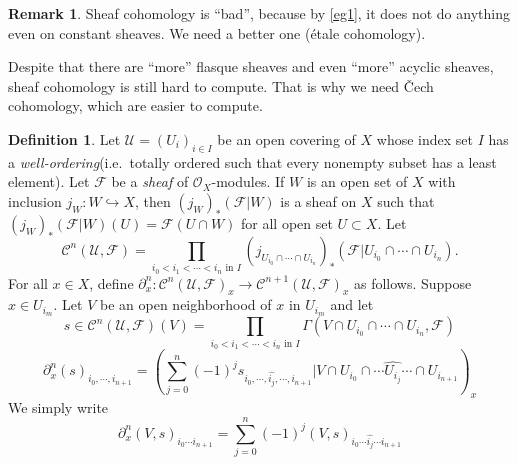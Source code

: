 \documentclass{amsart}
\numberwithin{equation}{section}
\theoremstyle{plain}
\theoremstyle{definition}
\newtheorem{defn}[equation]{Definition}
\newtheorem{rem}[equation]{Remark}
\begin{document}
\begin{rem}	
	Sheaf cohomology is ``bad'', because by \cref{eg1}, it does not do anything even on constant sheaves. 
	We need a better one (\'etale cohomology). 
	
	Despite that there are ``more'' flasque sheaves and even ``more'' acyclic sheaves, sheaf cohomology is still hard to compute. 
	That is why we need \v{C}ech cohomology, which are easier to compute.
\end{rem}

\begin{defn}
	Let $ \mathscr U=(U_i)_{i\in I} $ be an open covering of $ X $ whose index set $ I $ has a \textit{well-ordering}(i.e.~totally ordered such that every nonempty subset has a least element). 
%	
%	
	Let $ \mathscr F $ be a \textit{sheaf} of $ \mathcal O_X $-modules. 
	If $ W $ is an open set of $ X $ with inclusion $ j_W: W\hookrightarrow X $, then $ (j_W)_*(\mathscr F|W) $ is a sheaf on $ X $ such that $ (j_W)_*(\mathscr F|W)(U)=\mathscr F(U\cap W) $ for all open set $ U\subset X $. 
	Let $$ \mathscr C^n(\mathscr U, \mathscr F)=\prod\limits_{i_0<i_1<\cdots<i_n\text{ in } I}(j_{U_{i_0}\cap\cdots \cap U_{i_n}})_*(\mathscr F|U_{i_0}\cap\cdots \cap U_{i_n}). $$
	For all $ x\in X $, define 
	$\partial_x^n:\mathscr C^n(\mathscr U, \mathscr F)_x\to \mathscr C^{n+1}(\mathscr U, \mathscr F)_x$ as follows. 
	Suppose $ x \in U_{i_m}$. Let $ V $ be an open neighborhood of $ x $ in $ U_{i_m} $ and let $$ s\in \mathscr C^n(\mathscr U, \mathscr F)(V)=\prod\limits_{i_0<i_1<\cdots<i_n\text{ in } I}\Gamma(V\cap U_{i_0}\cap\cdots \cap U_{i_n}, \mathscr F) $$
	$$ \partial_x^n(s)_{i_0,\cdots, i_{n+1}}
	=\left(\sum\limits_{j=0}^{n}(-1)^j
	s_{i_0,\cdots,\widehat{i_j},\cdots, i_{n+1}}
	|V\cap U_{i_0}\cap\cdots\widehat{U_{i_j}}\cdots\cap U_{i_{n+1}}
	\right)_x$$
	We simply write
	\[\partial_x^n(V,s)_{i_0\cdots i_{n+1}}
	=\sum\limits_{j=0}^{n}(-1)^j
	(V,s)_{i_0\cdots\widehat{i_j}\cdots i_{n+1}}
	\]
\end{defn}
\end{document}
